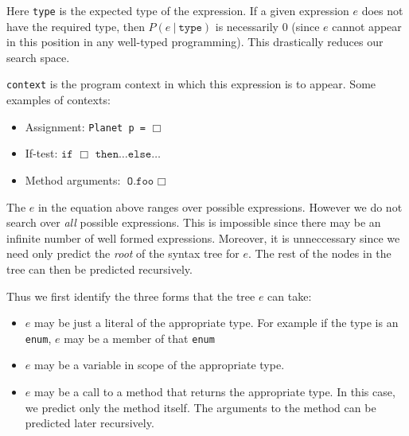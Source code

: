 \documentclass{article} %
\begin{document}
Here \texttt{type} is the expected type of the expression. If a given expression $e$ does not have the required type, then $P(e ~|~ \texttt{type})$ is necessarily $0$ (since $e$ cannot appear in this position in any well-typed programming). This drastically reduces our search space.

\texttt{context} is the program context in which this expression is to appear. Some examples of contexts:
\begin{itemize}
  \item Assignment: \texttt{Planet p =} $\Box$
  \item If-test: $\texttt{if }\Box\texttt{ then}\ldots\texttt{else}\ldots$
  \item Method arguments: $\texttt{O.foo }\Box$
\end{itemize}

The $e$ in the equation above ranges over possible expressions. However we do not search over \emph{all} possible expressions. This is impossible since there may be an infinite number of well formed expressions. Moreover, it is unneccessary since we need only predict the \emph{root} of the syntax tree for $e$. The rest of the nodes in the tree can then be predicted recursively.

Thus we first identify the three forms that the tree $e$ can take:
\begin{itemize}
  \item $e$ may be just a literal of the appropriate type. For example if the type is an \texttt{enum}, $e$ may be a member of that \texttt{enum}
  \item $e$ may be a variable in scope of the appropriate type.
  \item $e$ may be a call to a method that returns the appropriate type. In this case, we predict only the method itself. The arguments to the method can be predicted later recursively.
\end{itemize}
\end{document}
